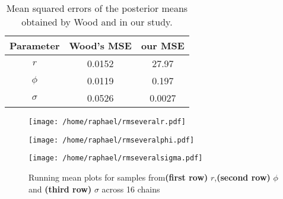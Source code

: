 \documentclass{article}
\begin{document}
	\begin{table}[htb]
		\centering
		\vspace{5mm}
		\begin{tabular}{c|c|c}
			Parameter & Wood's MSE & our MSE \\ \hline
			$r$ & 0.0152 & 27.97 \\ \hline
			$\phi$ & 0.0119 & 0.197\\ \hline
			$\sigma$ & 0.0526 &  0.0027 \\ \hline
		\end{tabular}
		\caption{Mean squared errors of the posterior means obtained by Wood and in our study.}
		\label{table:mse}
		\vspace{5mm}
	\end{table}
	
	\begin{figure}[htb]
		\centering
		\begin{minipage}{0.6\textwidth}
			\centering
			\texttt{[image: /home/raphael/rmseveralr.pdf]}
		\end{minipage}
		\begin{minipage}{0.6\textwidth}
			\centering
			\texttt{[image: /home/raphael/rmseveralphi.pdf]}
		\end{minipage}
		\begin{minipage}{0.6\textwidth}
			\centering
			\texttt{[image: /home/raphael/rmseveralsigma.pdf]}
		\end{minipage}
		\caption{Running mean plots for samples from\textbf{(first row)} $r$,\textbf{(second row)} $\phi$ and \textbf{(third row)} $\sigma$ across 16 chains}
		\label{fig:rm}
	\end{figure}

\clearpage

	
{}
\end{document}
